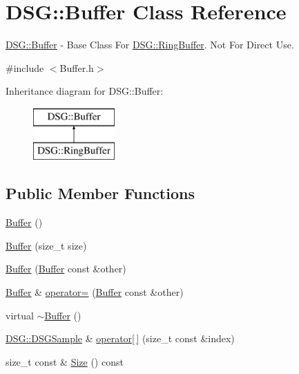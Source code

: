 \hypertarget{class_d_s_g_1_1_buffer}{\section{D\+S\+G\+:\+:Buffer Class Reference}
\label{class_d_s_g_1_1_buffer}
}


\hyperlink{class_d_s_g_1_1_buffer}{D\+S\+G\+::\+Buffer} -\/ Base Class For \hyperlink{class_d_s_g_1_1_ring_buffer}{D\+S\+G\+::\+Ring\+Buffer}. Not For Direct Use.  




{\ttfamily \#include $<$Buffer.\+h$>$}

Inheritance diagram for D\+S\+G\+:\+:Buffer\+:\begin{figure}[H]
\begin{center}
\leavevmode
\includegraphics[height=2.000000cm]{class_d_s_g_1_1_buffer}
\end{center}
\end{figure}
\subsection*{Public Member Functions}
\begin{DoxyCompactItemize}
\item 
\hyperlink{class_d_s_g_1_1_buffer_aa764dd8c389dcff51de08cb81fafeb86}{Buffer} ()
\item 
\hyperlink{class_d_s_g_1_1_buffer_a0e6502fd61833043744f9df94e8d5111}{Buffer} (size\+\_\+t size)
\item 
\hyperlink{class_d_s_g_1_1_buffer_a468a65d70553dfb773e4592b4b077683}{Buffer} (\hyperlink{class_d_s_g_1_1_buffer}{Buffer} const \&other)
\item 
\hyperlink{class_d_s_g_1_1_buffer}{Buffer} \& \hyperlink{class_d_s_g_1_1_buffer_a977d572a7d402ff6bf991d7c5c0cc6a7}{operator=} (\hyperlink{class_d_s_g_1_1_buffer}{Buffer} const \&other)
\item 
virtual \hyperlink{class_d_s_g_1_1_buffer_a619fc41bf263a419da1a19254e194101}{$\sim$\+Buffer} ()
\item 
\hyperlink{namespace_d_s_g_ac39a94cd27ebcd9c1e7502d0c624894a}{D\+S\+G\+::\+D\+S\+G\+Sample} \& \hyperlink{class_d_s_g_1_1_buffer_a5358d81096cd0801e4fce7851809b3ef}{operator\mbox{[}$\,$\mbox{]}} (size\+\_\+t const \&index)
\item 
size\+\_\+t const \& \hyperlink{class_d_s_g_1_1_buffer_a4acea659d9cd0be652ec55d21e5b0262}{Size} () const 
\end{DoxyCompactItemize}
